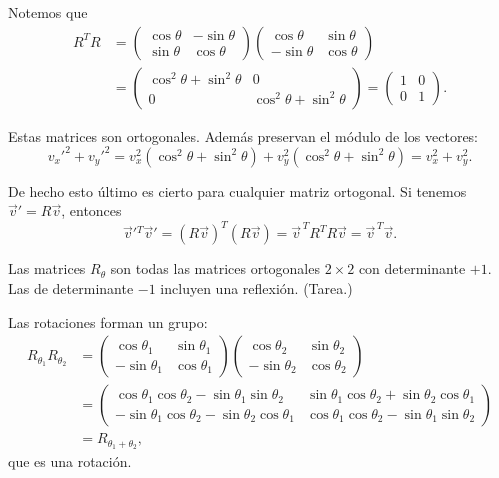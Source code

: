 \documentclass[11pt,a4paper]{article}
\begin{document}
Notemos que
\begin{align*}
  R^TR
  &=
  \begin{pmatrix}
    \cos\theta & -\sin\theta\\
    \sin\theta & \cos\theta
  \end{pmatrix}
  \begin{pmatrix}
    \cos\theta & \sin\theta\\
    -\sin\theta & \cos\theta
  \end{pmatrix} \\
  &=
  \begin{pmatrix}
    \cos^2\theta+\sin^2\theta & 0\\
    0 & \cos^2\theta+\sin^2\theta
  \end{pmatrix}
  =
  \begin{pmatrix}
    1&0\\0&1
  \end{pmatrix}.
\end{align*}

Estas matrices son ortogonales. Además preservan el módulo de los vectores:
\[
  v_x'^2+v_y'^2
  =v_x^2(\cos^2\theta+\sin^2\theta)
   +v_y^2(\cos^2\theta+\sin^2\theta)
  =v_x^2+v_y^2.
\]

De hecho esto último es cierto para cualquier matriz ortogonal. Si tenemos $\vec v'=R\vec v$, entonces
\[
  \vec v'{}^T\vec v'
  =(R\vec v)^T(R\vec v)
  =\vec v^{\,T}R^TR\vec v
  =\vec v^{\,T}\vec v.
\]

Las matrices $R_\theta$ son todas las matrices ortogonales $2\times2$
con determinante $+1$. Las de determinante $-1$ incluyen una reflexión.
(Tarea.)

Las rotaciones forman un grupo:
\begin{align*}
  R_{\theta_1}R_{\theta_2}
  &=
  \begin{pmatrix}
    \cos\theta_1 & \sin\theta_1\\
    -\sin\theta_1 & \cos\theta_1
  \end{pmatrix}
  \begin{pmatrix}
    \cos\theta_2 & \sin\theta_2\\
    -\sin\theta_2 & \cos\theta_2
  \end{pmatrix} \\
  &=
  \begin{pmatrix}
    \cos\theta_1\cos\theta_2-\sin\theta_1\sin\theta_2
      & \sin\theta_1\cos\theta_2+\sin\theta_2\cos\theta_1\\
    -\sin\theta_1\cos\theta_2-\sin\theta_2\cos\theta_1
      & \cos\theta_1\cos\theta_2-\sin\theta_1\sin\theta_2
  \end{pmatrix} \\
  &=R_{\theta_1+\theta_2},
\end{align*}
que es una rotación.
\end{document}
